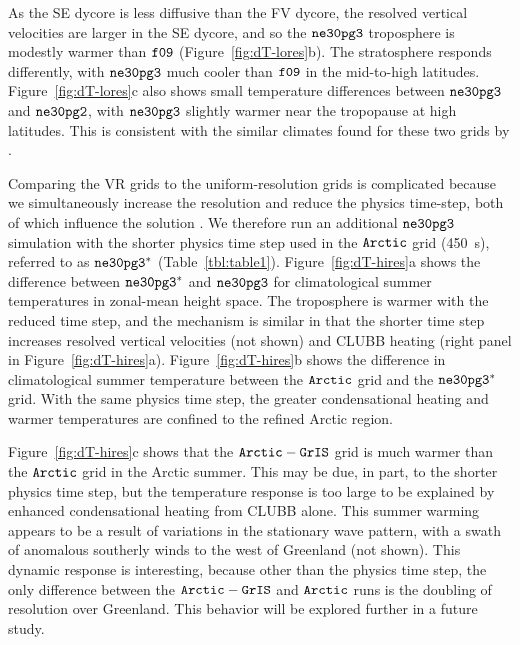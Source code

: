 \documentclass[draft]{agujournal2019}
\begin{document}
As the SE dycore is less diffusive than the FV dycore, the resolved vertical velocities are larger in the SE dycore, and so the $\tt ne30pg3$ troposphere is modestly warmer than $\tt f09$ (Figure~\ref{fig:dT-lores}b). The stratosphere responds differently, with $\tt ne30pg3$ much cooler than $\tt f09$ in the mid-to-high latitudes. Figure~\ref{fig:dT-lores}c also shows small temperature differences between $\tt ne30pg3$ and $\tt ne30pg2$, with  $\tt ne30pg3$ slightly warmer near the tropopause at high latitudes. This is consistent with the similar climates found for these two grids by .

Comparing the VR grids to the uniform-resolution grids is complicated because we simultaneously increase the resolution and reduce the physics time-step, both of which influence the solution \cite{W2008TELLUS}. We therefore run an additional $\tt ne30pg3$ simulation with the shorter physics time step used in the $\tt Arctic$ grid (450~s), referred to as $\tt ne30pg3^{*}$ (Table~\ref{tbl:table1}). Figure~\ref{fig:dT-hires}a shows the difference between $\tt ne30pg3^{*}$ and $\tt ne30pg3$ for climatological summer temperatures in zonal-mean height space. The troposphere is warmer with the reduced time step, and the mechanism is similar in that the shorter time step increases resolved vertical velocities (not shown) and CLUBB heating (right panel in Figure~\ref{fig:dT-hires}a). Figure~\ref{fig:dT-hires}b shows the difference in climatological summer temperature between the $\tt Arctic$ grid and the $\tt ne30pg3^{*}$ grid.  With the same physics time step, the greater condensational heating and warmer temperatures are confined to the refined Arctic region.

Figure~\ref{fig:dT-hires}c shows that the $\tt Arctic-GrIS$ grid is much warmer than the $\tt Arctic$ grid in the Arctic summer. This may be due, in part, to the shorter physics time step, but the temperature response is too large to be explained by enhanced condensational heating from CLUBB alone. This summer warming appears to be a result of variations in the stationary wave pattern, with a swath of anomalous southerly winds to the west of Greenland (not shown). This dynamic response is interesting, because other than the physics time step, the only difference between the $\tt Arctic-GrIS$ and $\tt Arctic$ runs is the doubling of resolution over Greenland. This behavior will be explored further in a future study.
\end{document}

